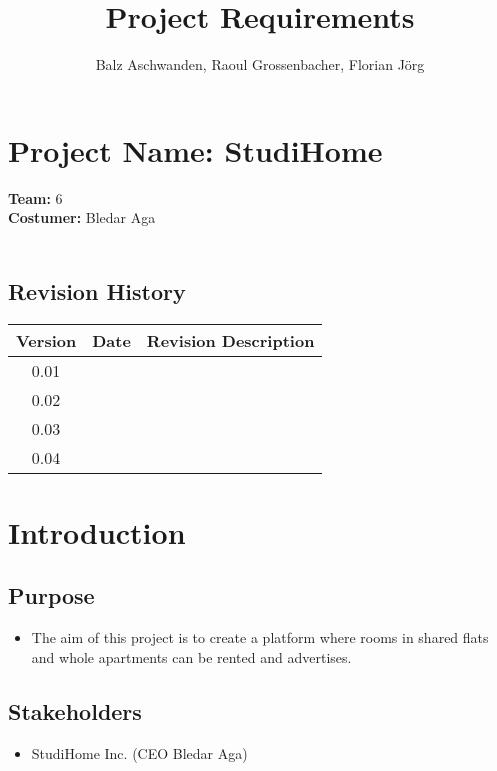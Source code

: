 \documentclass[a4paper,11pt]{article}
\title{Project Requirements}
\author{Balz Aschwanden, Raoul Grossenbacher, Florian Jörg}
\begin{document}
\maketitle
\section*{Project Name: StudiHome}
\textbf{Team:} 6\\
\textbf{Costumer:} Bledar Aga\\ \\
\subsection*{Revision History}
\begin{tabular}{|c|c|c|} \hline
  Version & Date & Revision Description \\ \hline
  0.01 & & \\ \hline
  0.02 & & \\ \hline
  0.03 & & \\ \hline
  0.04 & & \\ \hline
\end{tabular}

\section{Introduction}

\subsection*{Purpose}
\begin{itemize}
  \item The aim of this project is to create a platform where rooms in shared flats and whole apartments can be rented and advertises.
\end{itemize}

\subsection*{Stakeholders}
\begin{itemize}
  \item StudiHome Inc. (CEO Bledar Aga)
\end{itemize}
\end{document}
